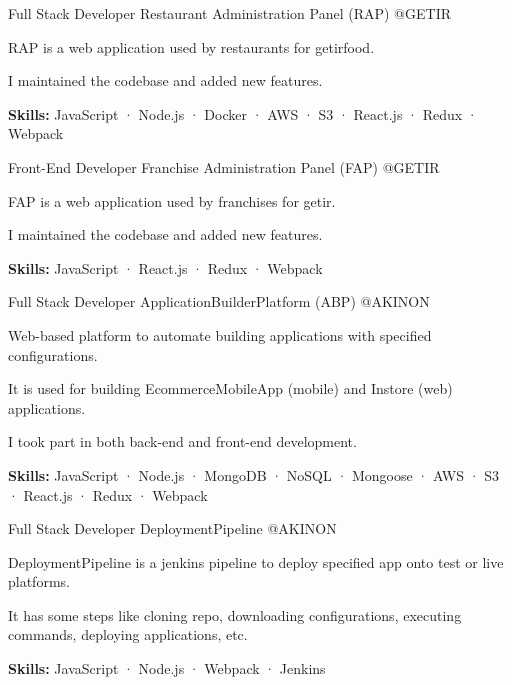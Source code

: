 \begin{cventries}
  \cventry
    {Full Stack Developer} %
    {Restaurant Administration Panel (RAP)} %
    {@GETIR} %
    {}
    {
      \begin{cvitems} %
        \item {RAP is a web application used by restaurants for getirfood.}
        \item {I maintained the codebase and added new features.}
        \item {\textbf {Skills:} JavaScript · Node.js · Docker · AWS · S3 · React.js · Redux · Webpack}
      \end{cvitems}
    }

  \cventry
    {Front-End Developer} %
    {Franchise Administration Panel (FAP)} %
    {@GETIR} %
    {}
    {
      \begin{cvitems} %
        \item {FAP is a web application used by franchises for getir.}
        \item {I maintained the codebase and added new features.}
        \item {\textbf {Skills:} JavaScript · React.js · Redux · Webpack}
      \end{cvitems}
    }

  \cventry
    {Full Stack Developer} %
    {ApplicationBuilderPlatform (ABP)} %
    {@AKINON} %
    {}
    {
      \begin{cvitems} %
        \item {Web-based platform to automate building applications with specified configurations.}
        \item {It is used for building EcommerceMobileApp (mobile) and Instore (web) applications.}
        \item {I took part in both back-end and front-end development.}
        \item {\textbf {Skills:} JavaScript · Node.js · MongoDB · NoSQL · Mongoose · AWS · S3 · React.js · Redux · Webpack}
      \end{cvitems}
    }

  \cventry
    {Full Stack Developer} %
    {DeploymentPipeline} %
    {@AKINON} %
    {}
    {
      \begin{cvitems} %
        \item {DeploymentPipeline is a jenkins pipeline to deploy specified app onto test or live platforms.}
        \item {It has some steps like cloning repo, downloading configurations, executing commands, deploying applications, etc.}
        \item {\textbf {Skills:} JavaScript · Node.js · Webpack · Jenkins}
      \end{cvitems}
    }


\end{cventries}
